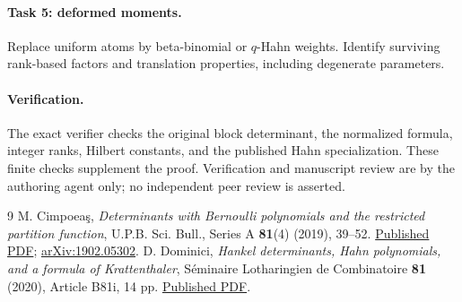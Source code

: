 \documentclass[11pt]{article}
\begin{document}
\paragraph{Task 5: deformed moments.}
Replace uniform atoms by beta-binomial or $q$-Hahn weights.
Identify surviving rank-based factors and translation properties,
including degenerate parameters.

\paragraph{Verification.}
The exact verifier checks the original block determinant, the
normalized formula, integer ranks, Hilbert constants, and the
published Hahn specialization. These finite checks supplement the
proof. Verification and manuscript review are by the authoring
agent only; no independent peer review is asserted.

\begin{thebibliography}{9}
M. Cimpoea\c{s}, \emph{Determinants with Bernoulli polynomials and the
restricted partition function}, U.P.B. Sci. Bull., Series A
\textbf{81}(4) (2019), 39--52.
\href{https://www.scientificbulletin.upb.ro/static/pdfs/fullf2e_830874.pdf}{Published PDF};
\href{https://arxiv.org/abs/1902.05302}{arXiv:1902.05302}.
D. Dominici, \emph{Hankel determinants, Hahn polynomials, and a formula
of Krattenthaler}, S\'eminaire Lotharingien de Combinatoire
\textbf{81} (2020), Article B81i, 14 pp.
\href{https://www.mat.univie.ac.at/~slc/wpapers/s81dominici.pdf}{Published PDF}.
\end{thebibliography}
\end{document}
